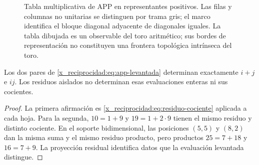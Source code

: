 \begin{figure}[tbp]
\centering
{}
\caption{Tabla multiplicativa de APP en representantes positivos. Las filas y columnas no unitarias se distinguen por trama gris; el marco identifica el bloque diagonal adyacente de diagonales iguales. La tabla dibujada es un observable del toro aritmético; sus bordes de representación no constituyen una frontera topológica intrínseca del toro.}
\label{x_reciprocidad:fig:app}
\end{figure}



\begin{proposition}
Los dos pares de \eqref{x_reciprocidad:eq:app-levantada} determinan exactamente \(i+j\) e \(ij\). Los residuos aislados no determinan esas evaluaciones enteras ni sus cocientes.
\end{proposition}
\begin{proof}
La primera afirmación es \eqref{x_reciprocidad:eq:residuo-cociente} aplicada a cada hoja. Para la segunda, \(10=1+9\) y \(19=1+2\cdot9\) tienen el mismo residuo y distinto cociente. En el soporte bidimensional, las posiciones \((5,5)\) y \((8,2)\) dan la misma suma y el mismo residuo producto, pero productos \(25=7+18\) y \(16=7+9\). La proyección residual identifica datos que la evaluación levantada distingue.
\end{proof}

